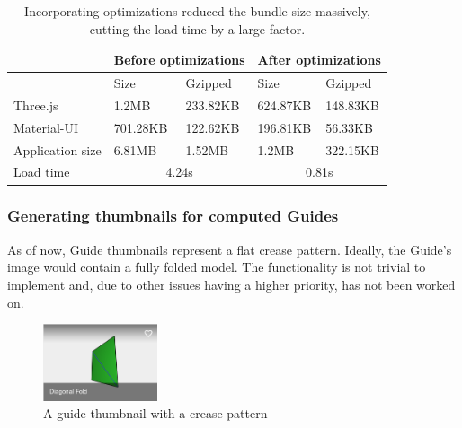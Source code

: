 \begin{table}[H]
\label{bundle-size-optimizations}
\caption{Incorporating optimizations reduced the bundle size massively, cutting the load time by a large factor.}
\begin{minipage}[t]{\linewidth}
\begin{tabular}{|l|l|l|l|l|}
\hline
\multicolumn{1}{|c|}{} & \multicolumn{2}{l|}{Before optimizations} & \multicolumn{2}{l|}{After optimizations} \\ \hline
                       & Size                & Gzipped            & Size                & Gzipped            \\ \hline
Three.js               & 1.2MB               & 233.82KB           & 624.87KB            & 148.83KB           \\ \hline
Material-UI            & 701.28KB            & 122.62KB           & 196.81KB            & 56.33KB            \\ \hline
Application size       & 6.81MB              & 1.52MB             & 1.2MB               & 322.15KB           \\ \hline
\multicolumn{1}{|l|}{Load time\footnotemark} & \multicolumn{2}{c|}{4.24s} & \multicolumn{2}{c|}{0.81s} \\ \hline
\end{tabular}
\end{minipage}
\end{table}

\subsubsection{Generating thumbnails for computed Guides}

As of now, Guide thumbnails represent a flat crease pattern. Ideally, the Guide's image would contain a fully folded model. The functionality is not trivial to implement and, due to other issues having a higher priority, has not been worked on.

\begin{figure}[H]
	\caption{A guide thumbnail with a crease pattern}
  \centering
    \includegraphics[width=0.3\textwidth]{assets/3-thumbnails.png}
\end{figure}

